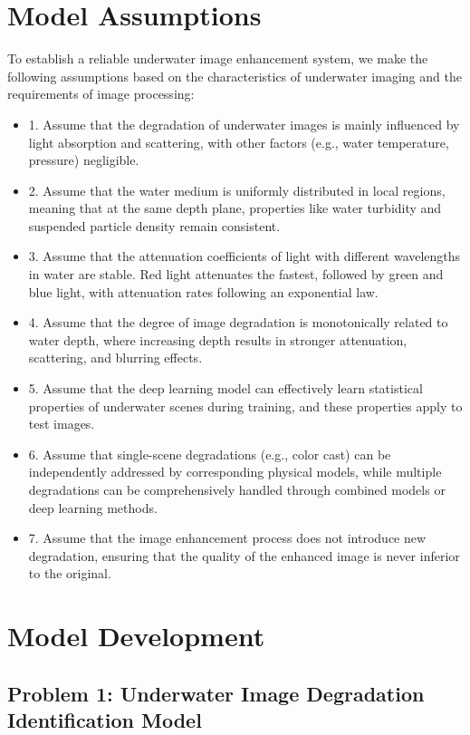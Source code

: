 \documentclass{apmcmthesis}
\begin{document}
\section{Model Assumptions}
To establish a reliable underwater image enhancement system, we make the following assumptions based on the characteristics of underwater imaging and the requirements of image processing:
\begin{itemize}
    \item 1. Assume that the degradation of underwater images is mainly influenced by light absorption and scattering, with other factors (e.g., water temperature, pressure) negligible.
    \item 2. Assume that the water medium is uniformly distributed in local regions, meaning that at the same depth plane, properties like water turbidity and suspended particle density remain consistent.
    \item 3. Assume that the attenuation coefficients of light with different wavelengths in water are stable. Red light attenuates the fastest, followed by green and blue light, with attenuation rates following an exponential law.
    \item 4. Assume that the degree of image degradation is monotonically related to water depth, where increasing depth results in stronger attenuation, scattering, and blurring effects.
    \item 5. Assume that the deep learning model can effectively learn statistical properties of underwater scenes during training, and these properties apply to test images.
    \item 6. Assume that single-scene degradations (e.g., color cast) can be independently addressed by corresponding physical models, while multiple degradations can be comprehensively handled through combined models or deep learning methods.
    \item 7. Assume that the image enhancement process does not introduce new degradation, ensuring that the quality of the enhanced image is never inferior to the original.
\end{itemize}

\section{Model Development}

\subsection{Problem 1: Underwater Image Degradation Identification Model}
\end{document}
